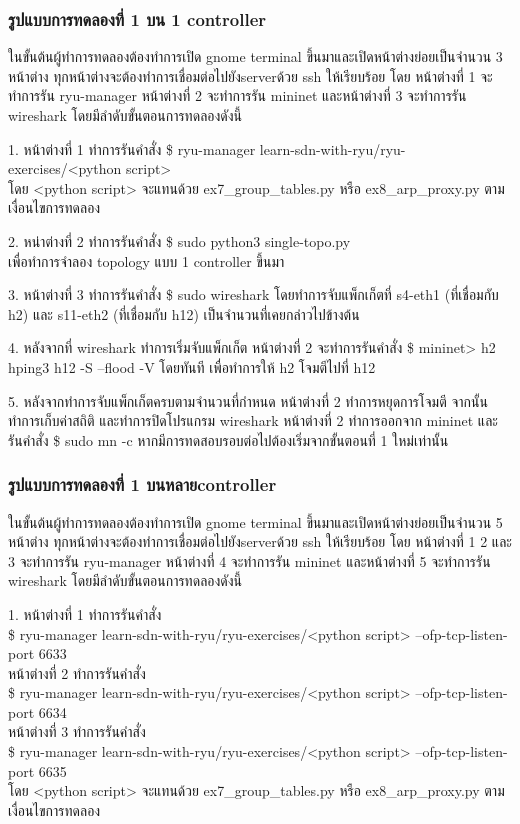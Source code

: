 \subsubsection*{รูปแบบการทดลองที่ 1 บน 1 \gls{controller}}

ในขั้นต้นผู้ทำการทดลองต้องทำการเปิด gnome terminal ขึ้นมาและเปิดหน้าต่างย่อยเป็นจำนวน 3 หน้าต่าง
ทุกหน้าต่างจะต้องทำการเชื่อมต่อไปยัง\gls{server}ด้วย ssh ให้เรียบร้อย
โดย หน้าต่างที่ 1 จะทำการรัน ryu-manager หน้าต่างที่ 2 จะทำการรัน mininet และหน้าต่างที่ 3 จะทำการรัน wireshark
โดยมีลำดับขั้นตอนการทดลองดังนี้


1. หน้าต่างที่ 1 ทำการรันคำสั่ง    
\$ ryu-manager learn-sdn-with-ryu/ryu-exercises/<python script> \\
โดย <python script> จะแทนด้วย ex7\_group\_tables.py หรือ ex8\_arp\_proxy.py ตามเงื่อนไขการทดลอง

2. หน่าต่างที่ 2 ทำการรันคำสั่ง    
\$ sudo python3 single-topo.py \\
เพื่อทำการจำลอง topology แบบ 1 \gls{controller} ขึ้นมา

3. หน้าต่างที่ 3 ทำการรันคำสั่ง 
\$ sudo wireshark 
โดยทำการจับแพ็กเก็ตที่ s4-eth1 (ที่เชื่อมกับ h2) และ s11-eth2 (ที่เชื่อมกับ h12) เป็นจำนวนที่เคยกล่าวไปข้างต้น

4. หลังจากที่ wireshark ทำการเริ่มจับแพ็กเก็ต หน้าต่างที่ 2 จะทำการรันคำสั่ง \$ mininet> h2 hping3 h12 -S --flood -V
โดยทันที เพื่อทำการให้ h2 โจมตีไปที่ h12

5. หลังจากทำการจับแพ็กเก็ตครบตามจำนวนที่กำหนด หน้าต่างที่ 2 ทำการหยุดการโจมตี จากนั้นทำการเก็บค่าสถิติ และทำการปิดโปรแกรม wireshark
หน้าต่างที่ 2 ทำการออกจาก mininet และรันคำสั่ง \$ sudo mn -c หากมีการทดสอบรอบต่อไปต้องเริ่มจากขั้นตอนที่ 1 ใหม่เท่านั้น

\subsubsection*{รูปแบบการทดลองที่ 1 บนหลาย\gls{controller}}

ในขั้นต้นผู้ทำการทดลองต้องทำการเปิด gnome terminal ขึ้นมาและเปิดหน้าต่างย่อยเป็นจำนวน 5 หน้าต่าง
ทุกหน้าต่างจะต้องทำการเชื่อมต่อไปยัง\gls{server}ด้วย ssh ให้เรียบร้อย
โดย หน้าต่างที่ 1 2 และ 3 จะทำการรัน ryu-manager หน้าต่างที่ 4 จะทำการรัน mininet และหน้าต่างที่ 5 จะทำการรัน wireshark
โดยมีลำดับขั้นตอนการทดลองดังนี้

1. หน้าต่างที่ 1 ทำการรันคำสั่ง \\
\$ ryu-manager learn-sdn-with-ryu/ryu-exercises/<python script> --ofp-tcp-listen-port 6633 \\
\indent หน้าต่างที่ 2 ทำการรันคำสั่ง \\
\$ ryu-manager learn-sdn-with-ryu/ryu-exercises/<python script> --ofp-tcp-listen-port 6634  \\
\indent หน้าต่างที่ 3 ทำการรันคำสั่ง \\
\$ ryu-manager learn-sdn-with-ryu/ryu-exercises/<python script> --ofp-tcp-listen-port 6635  \\
โดย <python script> จะแทนด้วย 
ex7\_group\_tables.py หรือ ex8\_arp\_proxy.py
ตามเงื่อนไขการทดลอง

